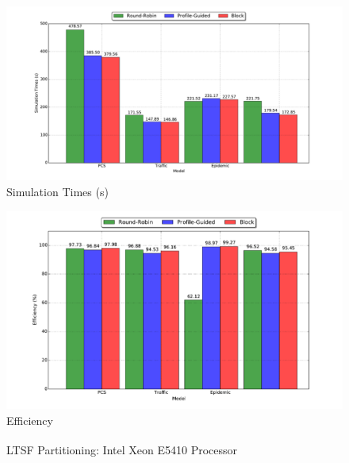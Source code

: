 \documentclass[11pt]{book}
\begin{document}
\begin{figure}
  \begin{minipage}{.5\textwidth}
    \begin{center}
      \includegraphics[width=\textwidth,keepaspectratio,quiet]{figs/partitioning_communication/partitioning_time_1node.pdf} \\
      Simulation Times (s) \\
    \end{center}
  \end{minipage}%
  \hfill
  \begin{minipage}{.5\textwidth}
    \begin{center}
      \includegraphics[width=\textwidth,keepaspectratio,quiet]{figs/partitioning_communication/partitioning_efficiency_1node.pdf} \\
      Efficiency \\
    \end{center}
  \end{minipage}
  \caption{LTSF Partitioning: Intel\textsuperscript{\textregistered} Xeon\textsuperscript{\textregistered} E5410 Processor}
  \label{ltsf_partitioning_beowulf}
\end{figure}
\end{document}
